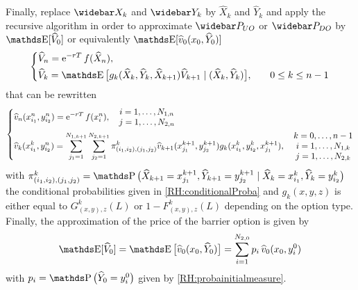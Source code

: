 \medskip
Finally, replace $\widebar X_k$ and $\widebar Y_k$ by $\widehat X_k$ and $\widehat Y_k$ and apply the recursive algorithm in order to approximate $\widebar P_{UO}$ or $\widebar P_{DO}$ by $\E [ \widehat V_0 ]$ or equivalently $\E [ \widehat v_0 (x_0, \widehat Y_0) ]$
\begin{equation} \label{RH:barrier_Quantif}
	\left\{ \begin{aligned}
		 & \widehat V_n = \e^{-rT} f ( \widehat X_n ),                                                                                                                          \\
		 & \widehat V_k = \E \big[ g_k(\widehat X_k,\widehat Y_k, \widehat X_{k+1}) \widehat V_{k+1} \mid (\widehat X_k, \widehat Y_k) \big] \mathrm{,\qquad} 0 \leq k \leq n-1
	\end{aligned} \right.
\end{equation}
that can be rewritten
\begin{equation} \label{RH:barrier_Quantif_num} \left\{
	\begin{aligned}
		 & \widehat v_n ( x_{i_1}^n, y_{i_2}^n ) = \operatorname{e}^{-rT} f ( x_i^n )
		,\quad
		\begin{matrix}
			i = 1, \dots, N_{1,n} \\
			j = 1, \dots, N_{2,n}
		\end{matrix}
		\\
		 & \widehat v_k ( x_{i_1}^k, y_{i_2}^n ) = \sum_{j_1 = 1}^{N_{1,k+1}} \sum_{j_2 = 1}^{N_{2,k+1}} \pi_{(i_1,i_2),(j_1,j_2)}^k \widehat{v}_{k+1} ( x_{j_1}^{k+1}, y_{j_2}^{k+1} ) g_k( x_{i_1}^k, y_{i_2}^k, x_{j_1}^{k+1} )
		, \quad
		\begin{matrix}
			k = 0, \dots, n-1     \\
			i = 1, \dots, N_{1,k} \\
			j = 1, \dots, N_{2,k}
		\end{matrix}
	\end{aligned} \right.
\end{equation}
with $ \pi_{(i_1,i_2),(j_1,j_2)}^k = \Prob \big( \widehat X_{k+1} = x_{j_1}^{k+1}, \widehat Y_{k+1} = y_{j_2}^{k+1} \mid \widehat X_k = x_{i_1}^k, \widehat Y_k = y_{i_2}^k \big)$ the conditional probabilities given in \eqref{RH:conditionalProba} and $g_k(x,y,z)$ is either equal to $G_{(x,y),z}^k(L)$ or $1- F_{(x,y),z}^k(L)$ depending on the option type. Finally, the approximation of the price of the barrier option is given by
\begin{equation}
	\E [ \widehat V_0 ] = \E \big[ \widehat v_0 ( x_0, \widehat Y_0 ) \big] = \sum_{i=1}^{N_{2,0}} p_i \, \widehat v_0 ( x_0, y_i^0 )
\end{equation}
with $p_i = \Prob \big( \widehat Y_0 = y_i^0 \big)$ given by \eqref{RH:probainitialmeasure}.


